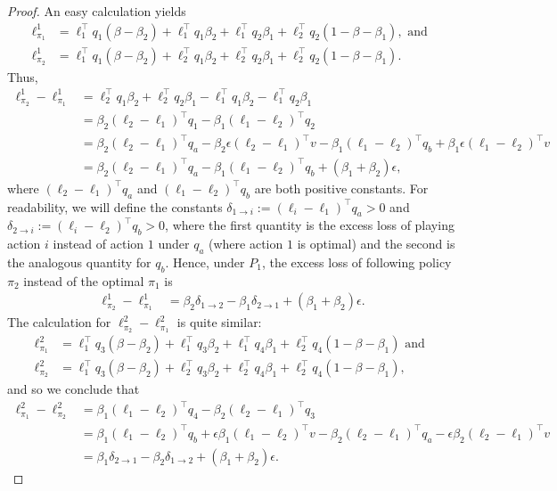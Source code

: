 \documentclass{article}
\begin{document}
\begin{proof}
An easy calculation yields
\begin{align*}
  \ell_{\pi_1}^1 &= \ell_1^\top q_1 (\beta - \beta_2) + \ell_1^\top q_1 \beta_2
          + \ell_1^\top q_2 \beta_1 + \ell_2^\top q_2 (1-\beta-\beta_1),\text{ and }\\
  \ell_{\pi_2}^1 &= \ell_1^\top q_1 (\beta - \beta_2) + \ell_2^\top q_1 \beta_2
          + \ell_2^\top q_2 \beta_1 + \ell_2^\top q_2 (1-\beta-\beta_1).
\end{align*}
Thus,
\begin{align*}
  \ell_{\pi_2}^1 - \ell_{\pi_1}^1
  &=
    \ell_2^\top q_1 \beta_2
    + \ell_2^\top q_2 \beta_1
    -\ell_1^\top q_1 \beta_2
    - \ell_1^\top q_2 \beta_1\\
  &=
    \beta_2(\ell_2 - \ell_1)^\top q_1 
    - \beta_1(\ell_1-\ell_2)^\top q_2 \\
  &=
    \beta_2(\ell_2 - \ell_1)^\top q_a
    -\beta_2 \epsilon (\ell_2 - \ell_1)^\top v
    - \beta_1(\ell_1-\ell_2)^\top q_b
    + \beta_1 \epsilon  (\ell_1-\ell_2)^\top v\\
  &=
    \beta_2(\ell_2 - \ell_1)^\top q_a
    - \beta_1(\ell_1-\ell_2)^\top q_b
    + (\beta_1+\beta_2) \epsilon,
\end{align*}
where $(\ell_2 - \ell_1)^\top q_a$ and $(\ell_1-\ell_2)^\top q_b$ are both positive constants. For readability, we will define the constants $\delta_{1\rightarrow i} := (\ell_i - \ell_1)^\top q_a>0$ and $\delta_{2 \rightarrow i} := (\ell_i - \ell_2)^\top q_b>0$, where the first quantity is  the excess loss of playing action $i$ instead of action $1$ under $q_a$ (where action $1$ is optimal) and the second is the analogous quantity for $q_b$. Hence, under $P_1$, the excess loss of following policy $\pi_2$ instead of the optimal $\pi_1$ is 
\begin{align*}
  \ell_{\pi_2}^1 - \ell_{\pi_1}^1
  &=
    \beta_2\delta_{1\rightarrow 2} 
    -
    \beta_1 \delta_{2\rightarrow 1}
    + (\beta_1 + \beta_2)\epsilon .
\end{align*}
The calculation for $\ell_{\pi_2}^2 - \ell_{\pi_1}^2$ is quite similar:
\begin{align*}
  \ell_{\pi_1}^2 &= \ell_1^\top q_3 (\beta - \beta_2) + \ell_1^\top q_3 \beta_2
          + \ell_1^\top q_4 \beta_1 + \ell_2^\top q_4 (1-\beta-\beta_1) \text{ and }\\
  \ell_{\pi_2}^2 &= \ell_1^\top q_3 (\beta - \beta_2) + \ell_2^\top q_3 \beta_2
          + \ell_2^\top q_4 \beta_1 + \ell_2^\top q_4 (1-\beta-\beta_1),
\end{align*}
and so we conclude that
\begin{align*}
\ell_{\pi_1}^2 - \ell_{\pi_2}^2
  &= 
    \beta_1(\ell_1-\ell_2)^\top q_4 
    -
    \beta_2(\ell_2 - \ell_1)^\top q_3\\
  &=
    \beta_1(\ell_1-\ell_2)^\top q_b
    +
    \epsilon \beta_1 (\ell_1-\ell_2)^\top v
    -
    \beta_2(\ell_2 - \ell_1)^\top q_a 
    - \epsilon  \beta_2(\ell_2 - \ell_1)^\top v\\
  &=
    \beta_1\delta_{2\rightarrow 1}
    -
    \beta_2\delta_{1\rightarrow 2}
    + (\beta_1+\beta_2)\epsilon .
\end{align*}


\end{proof}
\end{document}
